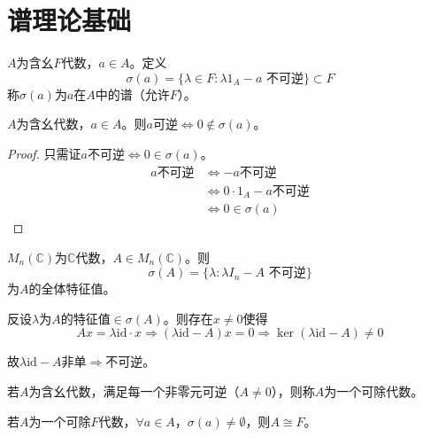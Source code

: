 \documentclass[lang=cn,a4paper,newtx,section]{elegantbook}
\begin{document}
\section{谱理论基础}

\begin{definition}[谱]
  $A$为含幺$F$代数，$a \in A$。定义
  \begin{equation*}
    \sigma(a) = \{\lambda \in F : \lambda 1_A - a \text{ 不可逆}\} \subset F
  \end{equation*}
  称$\sigma(a)$为$a$在$A$中的谱（允许$F$）。
\end{definition}

\begin{proposition}
  $A$为含幺代数，$a \in A$。则$a$可逆$\Longleftrightarrow 0 \notin \sigma(a)$。
\end{proposition}

\begin{proof}
  只需证$a$不可逆$\Longleftrightarrow 0 \in \sigma(a)$。
  \begin{align*}
    a\text{不可逆} &\Longleftrightarrow -a\text{不可逆} \\
    &\Longleftrightarrow 0 \cdot 1_A - a\text{不可逆} \\
    &\Longleftrightarrow 0 \in \sigma(a)
  \end{align*}
\end{proof}

\begin{example}
  $M_n(\mathbb{C})$为$\mathbb{C}$代数，$A \in M_n(\mathbb{C})$。则
  \begin{equation*}
    \sigma(A) = \{\lambda : \lambda I_n - A \text{ 不可逆}\}
  \end{equation*}
  为$A$的全体特征值。
  
  反设$\lambda$为$A$的特征值$\in \sigma(A)$。则存在$x \neq 0$使得
  \begin{equation*}
    Ax = \lambda \mathrm{id} \cdot x \Longrightarrow (\lambda \mathrm{id} - A)x = 0 \Longrightarrow \ker(\lambda \mathrm{id} - A) \neq 0
  \end{equation*}
  
  故$\lambda \mathrm{id} - A$非单$\Longrightarrow$不可逆。
\end{example}

\begin{definition}[可除代数]
  若$A$为含幺代数，满足每一个非零元可逆（$A \neq 0$），则称$A$为一个可除代数。
\end{definition}

\begin{proposition}
  若$A$为一个可除$F$代数，$\forall a \in A$，$\sigma(a) \neq \emptyset$，则$A \cong F$。
\end{proposition}
\end{document}
